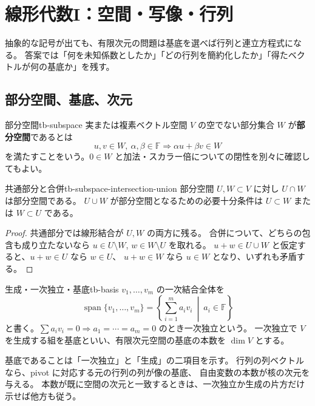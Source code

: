 \chapter{線形代数I：空間・写像・行列}
\label{ch:tb-linear-one}

抽象的な記号が出ても、有限次元の問題は基底を選べば行列と連立方程式になる。
答案では「何を未知係数としたか」「どの行列を簡約化したか」「得たベクトルが何の基底か」を残す。

\section{部分空間、基底、次元}

\begin{definition}{部分空間}{tb-subspace}
実または複素ベクトル空間 $V$ の空でない部分集合 $W$ が\textbf{部分空間}であるとは
\[
u,v\in W,\ \alpha,\beta\in\mathbb F
\Longrightarrow \alpha u+\beta v\in W
\]
を満たすことをいう。$0\in W$ と加法・スカラー倍についての閉性を別々に確認してもよい。
\end{definition}

\begin{proposition}{共通部分と合併}{tb-subspace-intersection-union}
部分空間 $U,W\subset V$ に対し $U\cap W$ は部分空間である。
$U\cup W$ が部分空間となるための必要十分条件は
$U\subset W$ または $W\subset U$ である。
\end{proposition}

\begin{proof}
共通部分では線形結合が $U,W$ の両方に残る。
合併について、どちらの包含も成り立たないなら
$u\in U\setminus W$, $w\in W\setminus U$ を取れる。
$u+w\in U\cup W$ と仮定すると、$u+w\in U$ なら $w\in U$、
$u+w\in W$ なら $u\in W$ となり、いずれも矛盾する。
\end{proof}

\begin{definition}{生成・一次独立・基底}{tb-basis}
$v_1,\ldots,v_m$ の一次結合全体を
\[
\operatorname{span}\{v_1,\ldots,v_m\}
=\left\{\sum_{i=1}^m a_iv_i\ \middle|\ a_i\in\mathbb F\right\}
\]
と書く。$\sum a_iv_i=0\Rightarrow a_1=\cdots=a_m=0$ のとき一次独立という。
一次独立で $V$ を生成する組を基底といい、有限次元空間の基底の本数を $\dim V$ とする。
\end{definition}

基底であることは「一次独立」と「生成」の二項目を示す。
行列の列ベクトルなら、pivot に対応する元の行列の列が像の基底、
自由変数の本数が核の次元を与える。
本数が既に空間の次元と一致するときは、一次独立か生成の片方だけ示せば他方も従う。

